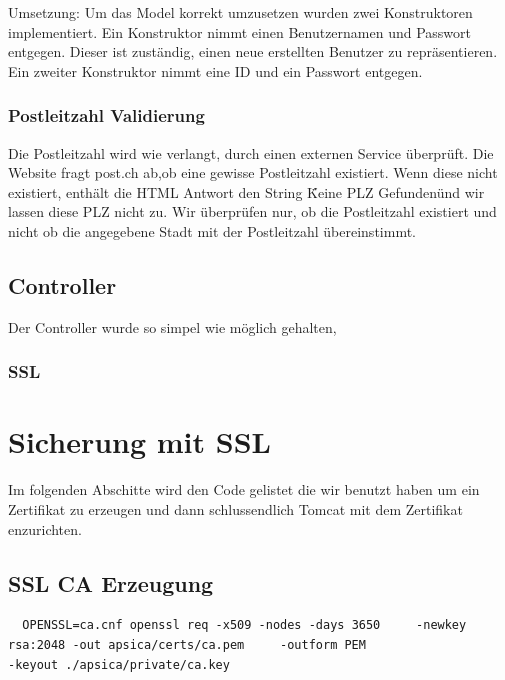 \documentclass[10pt]{scrartcl}
\begin{document}
Umsetzung:
Um das Model korrekt umzusetzen wurden zwei Konstruktoren implementiert. Ein Konstruktor nimmt einen Benutzernamen und Passwort entgegen. Dieser ist zuständig, einen neue erstellten Benutzer zu repräsentieren. Ein zweiter Konstruktor nimmt eine ID und ein Passwort entgegen. 

\subsubsection{Postleitzahl Validierung}
Die Postleitzahl wird wie verlangt, durch einen externen Service überprüft. Die Website fragt post.ch ab,ob eine gewisse Postleitzahl existiert. Wenn diese nicht existiert, enthält die HTML Antwort den String \"Keine PLZ Gefunden\" und wir lassen diese PLZ nicht zu. Wir überprüfen nur, ob die Postleitzahl existiert und nicht ob die angegebene Stadt mit der Postleitzahl übereinstimmt. 

\subsection{Controller}
Der Controller wurde so simpel wie möglich gehalten, 

\subsubsection{SSL}
\section{Sicherung mit SSL}
Im folgenden Abschitte wird den Code gelistet die wir benutzt haben um ein Zertifikat zu erzeugen und dann 
schlussendlich Tomcat mit dem Zertifikat enzurichten.

\subsection{SSL CA Erzeugung}
\begin{verbatim}
  OPENSSL=ca.cnf openssl req -x509 -nodes -days 3650     -newkey rsa:2048 -out apsica/certs/ca.pem     -outform PEM 
-keyout ./apsica/private/ca.key

\end{verbatim}
\end{document}
